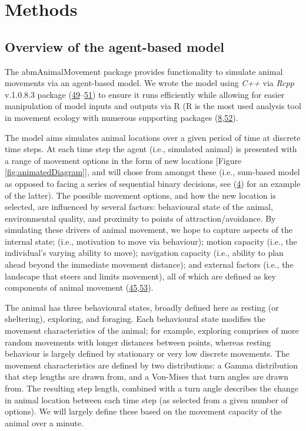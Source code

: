 \documentclass[10pt,a4paper]{article}
\begin{document}
\hypertarget{methods}{%
\section{Methods}\label{methods}}

\hypertarget{overview-of-the-agent-based-model}{%
\subsection{Overview of the agent-based model}\label{overview-of-the-agent-based-model}}

The abmAnimalMovement package provides functionality to simulate animal movements via an agent-based model.
We wrote the model using \emph{C++} via \emph{Rcpp} v.1.0.8.3 package (\protect\hyperlink{ref-Eddelbuettel_seamless_2011}{49}--\protect\hyperlink{ref-Eddelbuettel_extending_2018}{51}) to ensure it runs efficiently while allowing for easier manipulation of model inputs and outputs via R (R is the most used analysis tool in movement ecology with numerous supporting packages (\protect\hyperlink{ref-joo_recent_2022}{8},\protect\hyperlink{ref-joo_navigating_2020}{52}).

The model aims simulates animal locations over a given period of time at discrete time steps.
At each time step the agent (i.e., simulated animal) is presented with a range of movement options in the form of new locations {[}Figure \ref{fig:animatedDiagram}{]}, and will chose from amongst these (i.e., sum-based model as opposed to facing a series of sequential binary decisions, see (\protect\hyperlink{ref-sridhar_geometry_2021}{4}) for an example of the latter).
The possible movement options, and how the new location is selected, are influenced by several factors: behavioural state of the animal, environmental quality, and proximity to points of attraction/avoidance.
By simulating these drivers of animal movement, we hope to capture aspects of the internal state; (i.e., motivation to move via behaviour); motion capacity (i.e., the individual's varying ability to move); navigation capacity (i.e., ability to plan ahead beyond the immediate movement distance); and external factors (i.e., the landscape that steers and limits movement), all of which are defined as key components of animal movement (\protect\hyperlink{ref-Tang2010}{45},\protect\hyperlink{ref-Nathan2008}{53}).

The animal has three behavioural states, broadly defined here as resting (or sheltering), exploring, and foraging.
Each behavioural state modifies the movement characteristics of the animal; for example, exploring comprises of more random movements with longer distances between points, whereas resting behaviour is largely defined by stationary or very low discrete movements.
The movement characteristics are defined by two distributions: a Gamma distribution that step lengths are drawn from, and a Von-Mises that turn angles are drawn from.
The resulting step length, combined with a turn angle describes the change in animal location between each time step (as selected from a given number of options).
We will largely define these based on the movement capacity of the animal over a minute.
\end{document}
